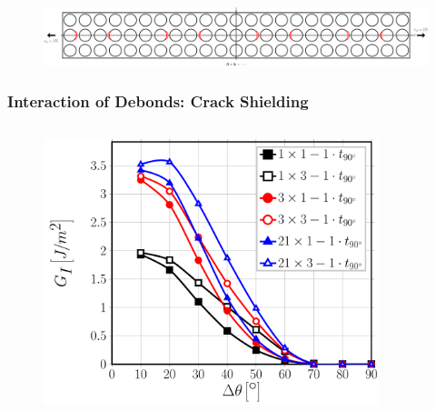 \documentclass[first,firstsupp,lastsupp,last,hyperref,table]{ETHclass}
\begin{document}
\begin{frame}
\begin{columns}[c]
\begin{column}{0.5\textwidth}
\begin{figure}
\end{figure}
\end{column}
\end{columns}
\begin{figure}
\centering
\includegraphics[width=\textwidth]{twofibers-sameside-crackshielding3.pdf}
\end{figure}
\end{frame}

\addtocounter{framenumber}{-1}

\begin{frame}
\frametitle{\vspace{0.2cm}\small Interaction of Debonds: Crack Shielding}
\vspace{-.75cm}
\centering
\begin{columns}[c]
\centering
\begin{column}{0.5\textwidth}
\centering
\begin{figure}
\centering
\includegraphics[width=\columnwidth]{nxk-1-vf60-GI-crackshield1.pdf}
\end{figure}
\end{column}
\begin{column}{0.5\textwidth}
\centering
\begin{figure}
\centering

\end{figure}
\end{column}
\end{columns}
\end{frame}
\end{document}
